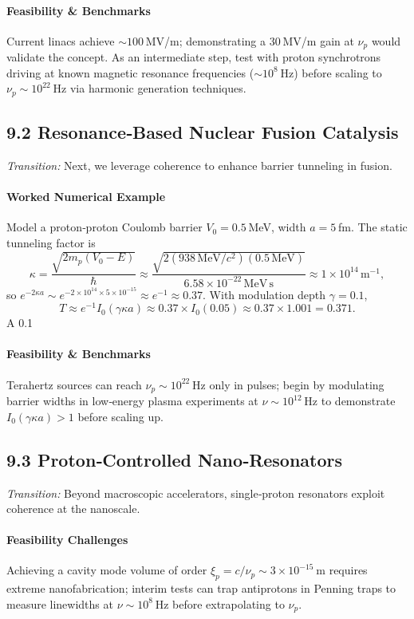 \paragraph{Feasibility \& Benchmarks}  
Current linacs achieve \(\sim100\) MV/m; demonstrating a 30 MV/m gain at \(\nu_p\) would validate the concept.  As an intermediate step, test with proton synchrotrons driving at known magnetic resonance frequencies (\(\sim10^8\) Hz) before scaling to \(\nu_p\sim10^{22}\) Hz via harmonic generation techniques.

\subsection{9.2 Resonance‐Based Nuclear Fusion Catalysis}
\emph{Transition:} Next, we leverage coherence to enhance barrier tunneling in fusion.

\paragraph{Worked Numerical Example}  
Model a proton‐proton Coulomb barrier \(V_0=0.5\) MeV, width \(a=5\) fm.  The static tunneling factor is
\[
\kappa = \frac{\sqrt{2m_p(V_0 - E)}}{\hbar}
\approx \frac{\sqrt{2(938\,\mathrm{MeV}/c^2)(0.5\,\mathrm{MeV})}}{6.58\times10^{-22}\,\mathrm{MeV\,s}}
\approx 1\times10^{14}\,\mathrm{m}^{-1},
\]
so \(e^{-2\kappa a}\sim e^{-2\times10^{14}\times5\times10^{-15}}\approx e^{-1}\approx0.37\).  With modulation depth \(\gamma=0.1\),
\[
T \approx e^{-1} I_0(\gamma\kappa a) \approx 0.37\times I_0(0.05)\approx0.37\times1.001=0.371.
\]
A 0.1 %

\paragraph{Feasibility \& Benchmarks}  
Terahertz sources can reach \(\nu_p\sim10^{22}\) Hz only in pulses; begin by modulating barrier widths in low‐energy plasma experiments at \(\nu\sim10^{12}\) Hz to demonstrate \(I_0(\gamma\kappa a)>1\) before scaling up.

\subsection{9.3 Proton‐Controlled Nano‐Resonators}
\emph{Transition:} Beyond macroscopic accelerators, single‐proton resonators exploit coherence at the nanoscale.

\paragraph{Feasibility Challenges}  
Achieving a cavity mode volume of order \(\xi_p = c/\nu_p\sim3\times10^{-15}\) m requires extreme nanofabrication; interim tests can trap antiprotons in Penning traps to measure linewidths at \(\nu\sim10^8\) Hz before extrapolating to \(\nu_p\).


